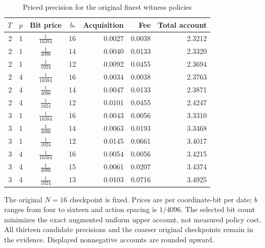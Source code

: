 \begin{table}[htbp]
\centering
\caption{Priced precision for the original finest witness policies}\label{tab:sensors48}
\footnotesize
\begin{tabular}{rrcrrrr}
\toprule
$T$ & $p$ & Bit price & $b_*$ & Acquisition & Fee & Total account\\
\midrule
2 & 1 & $\frac{1}{16384}$ & 16 & 0.0027 & 0.0038 & 2.3212 \\
2 & 1 & $\frac{1}{4096}$ & 14 & 0.0040 & 0.0133 & 2.3320 \\
2 & 1 & $\frac{1}{1024}$ & 12 & 0.0092 & 0.0455 & 2.3694 \\
2 & 4 & $\frac{1}{16384}$ & 16 & 0.0034 & 0.0038 & 2.3763 \\
2 & 4 & $\frac{1}{4096}$ & 14 & 0.0047 & 0.0133 & 2.3871 \\
2 & 4 & $\frac{1}{1024}$ & 12 & 0.0101 & 0.0455 & 2.4247 \\
3 & 1 & $\frac{1}{16384}$ & 16 & 0.0043 & 0.0056 & 3.3310 \\
3 & 1 & $\frac{1}{4096}$ & 14 & 0.0063 & 0.0193 & 3.3468 \\
3 & 1 & $\frac{1}{1024}$ & 12 & 0.0145 & 0.0661 & 3.4017 \\
3 & 4 & $\frac{1}{16384}$ & 16 & 0.0054 & 0.0056 & 3.4215 \\
3 & 4 & $\frac{1}{4096}$ & 15 & 0.0061 & 0.0207 & 3.4374 \\
3 & 4 & $\frac{1}{1024}$ & 13 & 0.0103 & 0.0716 & 3.4925 \\
\bottomrule
\end{tabular}
\begin{minipage}{0.97\linewidth}\footnotesize\vspace{3pt}
The original $N=16$ checkpoint is fixed. Prices are per coordinate-bit per date; $b$ ranges from four to sixteen and action spacing is $1/4096$. The selected bit count minimizes the exact augmented uniform upper account, not measured policy cost. All thirteen candidate precisions and the coarser original checkpoints remain in the evidence. Displayed nonnegative accounts are rounded upward.
\end{minipage}
\end{table}
